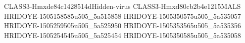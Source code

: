 CLASS3-Hmxde84c1428514dHidden-virus
CLASS3-Hmxd80cb2b4e1215MALS
HRIDOYE-1505158585u505_5a515858
HRIDOYE-1505350575u505_5a535057
HRIDOYE-1505259505u505_5a525950
HRIDOYE-1505353565u505_5a535356
HRIDOYE-1505254545u505_5a525454
HRIDOYE-1505350585u505_5a535058
